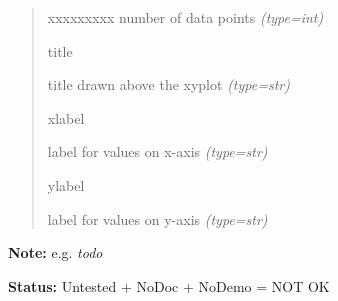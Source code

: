\begin{boxedminipage}{\funcwidth}
\begin{quote}
\begin{Ventry}{xxxxxxxxx}
number of data points
            {\it (type=int)}

          \item[title]


title drawn above the xyplot
            {\it (type=str)}

          \item[xlabel]


label for values on x-axis
            {\it (type=str)}

          \item[ylabel]


label for values on y-axis
            {\it (type=str)}

        \end{Ventry}

      \end{quote}

\textbf{Note:} 
e.g. \emph{todo}


\textbf{Status:} 
Untested + NoDoc + NoDemo = NOT OK


    \end{boxedminipage}

    \label{xformslib:flxyplot:fl_set_xyplot_file}

    \vspace{0.5ex}

